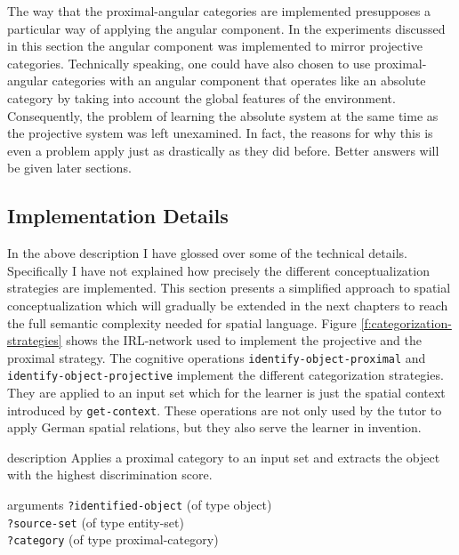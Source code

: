 The way that the proximal-angular categories are implemented presupposes a particular
way of applying the angular component. In the experiments discussed in this section
the angular component was implemented to mirror projective categories. 
Technically speaking, one could have also chosen to use proximal-angular
categories with an angular component that operates like an absolute category by
taking into account the global features of the environment. Consequently, 
the problem of learning the absolute system at the same time as the projective system 
was left unexamined. In fact, the reasons for why this is even a problem apply 
just as drastically as they did before. Better answers will be given later sections.

\subsection{Implementation Details}
In the above description I have glossed over some of the technical details. 
Specifically I have not explained how precisely the different conceptualization 
strategies are implemented. This section presents a simplified approach to spatial
conceptualization which will gradually be extended in the next chapters
to reach the full semantic complexity needed for spatial language.
Figure \ref{f:categorization-strategies} shows the IRL-network
used to implement the projective and the proximal strategy. The cognitive
operations {\footnotesize\tt identify-object-proximal} and  {\footnotesize\tt identify-object-projective}
implement the different categorization strategies. They are applied to an 
input set which for the learner is just the spatial context introduced by 
{\footnotesize\tt get-context}. These operations are not only used by the tutor to apply German 
spatial relations, but they also serve the learner in invention. 

\begin{explanation}{description}
Applies a proximal category to an input set and extracts the 
object with the highest discrimination score.
\end{explanation}
\begin{explanation}{arguments}
{\footnotesize\verb+?identified-object+} (of type object) \\
{\footnotesize\verb+?source-set+} (of type entity-set) \\
{\footnotesize\verb+?category+} (of type proximal-category)
\vspace{0.3cm}
\end{explanation}

